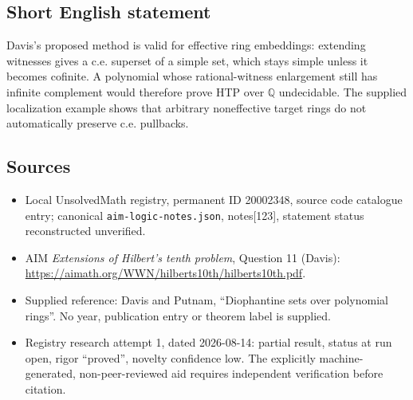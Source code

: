 \documentclass[11pt]{article}
\newcommand{\Q}{\mathbb{Q}}
\begin{document}
\subsection{Short English statement}
Davis's proposed method is valid for effective ring embeddings: extending witnesses gives a c.e. superset of a simple set, which stays simple unless it becomes cofinite. A polynomial whose rational-witness enlargement still has infinite complement would therefore prove HTP over $\Q$ undecidable. The supplied localization example shows that arbitrary noneffective target rings do not automatically preserve c.e. pullbacks.
\subsection{Sources}
\begin{itemize}
\item Local UnsolvedMath registry, permanent ID 20002348, source code catalogue entry; canonical \texttt{aim-logic-notes.json}, notes[123], statement status reconstructed unverified.
\item AIM \emph{Extensions of Hilbert's tenth problem}, Question 11 (Davis): \url{https://aimath.org/WWN/hilberts10th/hilberts10th.pdf}.
\item Supplied reference: Davis and Putnam, ``Diophantine sets over polynomial rings''. No year, publication entry or theorem label is supplied.
\item Registry research attempt 1, dated 2026-08-14: partial result, status at run open, rigor ``proved'', novelty confidence low. The explicitly machine-generated, non-peer-reviewed aid requires independent verification before citation.
\end{itemize}
\end{document}
